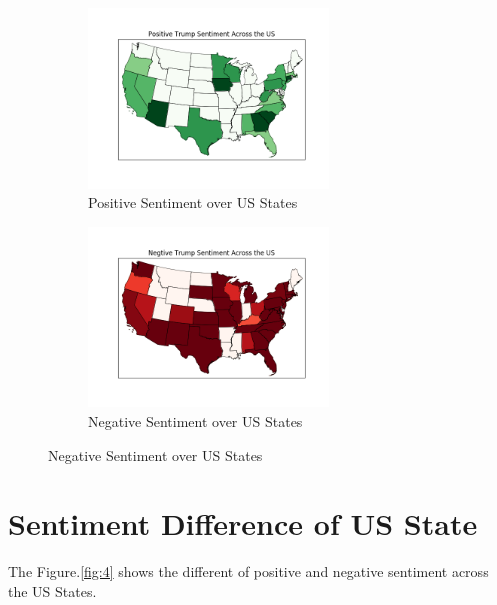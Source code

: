 \documentclass[12pt]{article}
\begin{document}
\begin{figure}[!h]
      \centering
    \begin{subfigure}
        \centering
        \includegraphics[width=0.7\textwidth]{../plots/part2_pos.png}
        \caption{Positive Sentiment over US States}
        \label{fig:2}
    \end{subfigure}%
    \vspace{1em}
    \begin{subfigure}
       \centering
        \includegraphics[width=0.7\textwidth]{../plots/part2_neg.png}
        \caption{Negative Sentiment over US States}
        \label{fig:3}
    \end{subfigure}
\end{figure}


\newpage 
\section{Sentiment Difference of US State}
The Figure.\ref{fig:4} shows the different of positive and negative sentiment across the US States.
\end{document}
